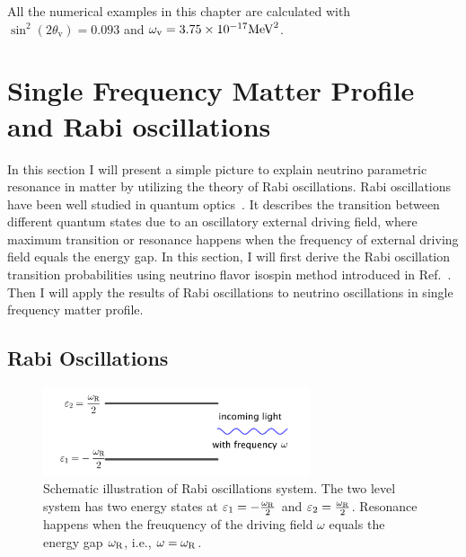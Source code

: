 All the numerical examples in this chapter are calculated with $\sin^2(2\theta_{\mathrm v}) = 0.093$ and $\omega_{\mathrm v} = 3.75\times 10^{-17}\mathrm{MeV}^2$.






\section{\label{chap:matter-sec:single}Single Frequency Matter Profile and Rabi oscillations}%


In this section I will present a simple picture to explain neutrino parametric resonance in matter by utilizing the theory of Rabi oscillations. Rabi oscillations have been well studied in quantum optics~\cite{Boyd2008}. It describes the transition between different quantum states due to an oscillatory external driving field, where maximum transition or resonance happens when the frequency of external driving field equals the energy gap. In this section, I will first derive the Rabi oscillation transition probabilities using neutrino flavor isospin method introduced in Ref.~\cite{Duan2006a}. Then I will apply the results of Rabi oscillations to neutrino oscillations in single frequency matter profile.


\subsection{\label{app:rabi-oscillations}Rabi Oscillations}

\begin{figure}[htbp]
    \centering
    \includegraphics[width=0.7\textwidth]{chapters/assets/matter/rabi-illustrative-diagram}
    \caption{Schematic illustration of Rabi oscillations system. The two level system has two energy states at $\varepsilon_1=-\frac{\omega_\mathrm R}{2}$ and $\varepsilon_2=\frac{\omega_\mathrm R}{2}$. Resonance happens when the freuquency of the driving field $\omega$ equals the energy gap $\omega_\mathrm R$, i.e., $\omega = \omega_\mathrm R$.}
    \label{chap:app-sec:rabi-oscillations-fig:rabi-diagram}
\end{figure}

